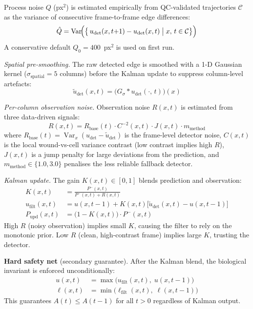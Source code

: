 Process noise $Q$ (px$^2$) is estimated empirically from QC-validated trajectories
$\mathcal{C}$ as the variance of consecutive frame-to-frame edge differences:
\begin{equation}
	\hat{Q} = \operatorname{Var}\!\Bigl(\bigl\{\,u_\text{det}(x,t{+}1) - u_\text{det}(x,t)\;\big|\; x,\,t \in \mathcal{C}\bigr\}\Bigr)
	\label{eq:Q-estimate}
\end{equation}
A conservative default $Q_0 = 400$~px$^2$ is used on first run.

\emph{Spatial pre-smoothing.}
The raw detected edge is smoothed with a 1-D Gaussian kernel ($\sigma_\text{spatial} = 5$
columns) before the Kalman update to suppress column-level artefacts:
\begin{equation}
	\tilde{u}_\text{det}(x, t) = \bigl(G_{\sigma} * u_\text{det}(\cdot,\, t)\bigr)(x)
	\label{eq:spatial-smooth}
\end{equation}

\emph{Per-column observation noise.}
Observation noise $R(x, t)$ is estimated from three data-driven signals:
\begin{equation}
	R(x, t) = R_\text{base}(t) \cdot C^{-2}(x, t) \cdot J(x, t) \cdot m_\text{method}
	\label{eq:R-estimate}
\end{equation}
where $R_\text{base}(t) = \operatorname{Var}_{x}(u_\text{det} - \tilde{u}_\text{det})$
is the frame-level detector noise, $C(x,t)$ is the local wound-vs-cell variance contrast
(low contrast implies high $R$), $J(x,t)$ is a jump penalty for large deviations from the
prediction, and $m_\text{method} \in \{1.0, 3.0\}$ penalises the less reliable fallback
detector.

\emph{Kalman update.}
The gain $K(x,t) \in [0, 1]$ blends prediction and observation:
\begin{align}
	K(x, t) &= \frac{P^-(x, t)}{P^-(x, t) + R(x, t)} \label{eq:kalman-gain} \\
	u_\text{filt}(x, t) &= u(x, t-1) + K(x, t)\bigl[\tilde{u}_\text{det}(x, t) - u(x, t-1)\bigr] \label{eq:kalman-update} \\
	P_\text{upd}(x, t) &= \bigl(1 - K(x, t)\bigr) \cdot P^-(x, t) \label{eq:P-update}
\end{align}
High $R$ (noisy observation) implies small $K$, causing the filter to rely on the monotonic
prior.
Low $R$ (clean, high-contrast frame) implies large $K$, trusting the detector.

\textbf{Hard safety net} (secondary guarantee).
After the Kalman blend, the biological invariant is enforced unconditionally:
\begin{align}
	u(x, t) &= \max\!\bigl(u_\text{filt}(x, t),\; u(x, t-1)\bigr) \label{eq:hard-upper} \\
	\ell(x, t) &= \min\!\bigl(\ell_\text{filt}(x, t),\; \ell(x, t-1)\bigr) \label{eq:hard-lower}
\end{align}
This guarantees $A(t) \leq A(t-1)$ for all $t > 0$ regardless of Kalman output.

